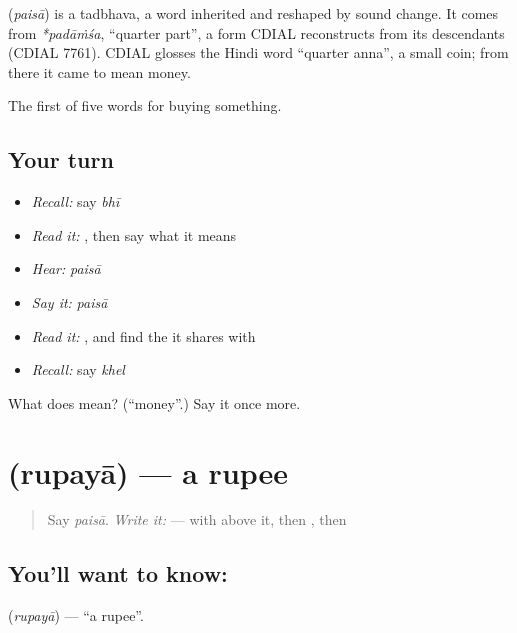 \begin{cousinweb}
\textbf{} (\emph{paisā}) is a tadbhava, a word inherited and reshaped by sound change. It comes from \emph{*padāṁśa}, \textquotedblleft{}quarter part\textquotedblright{}, a form CDIAL reconstructs from its descendants (CDIAL 7761). CDIAL glosses the Hindi word \textquotedblleft{}quarter anna\textquotedblright{}, a small coin; from there it came to mean money.
\end{cousinweb}

\begin{grammarlens}[title={What you've built}]
The first of five words for buying something.
\end{grammarlens}

\subsection*{Your turn}
\begin{itemize}
\raggedright
  \item \emph{Recall:} say \emph{bhī}
  \item \emph{Read it:} \textbf{}, then say what it means
  \item \emph{Hear:} \emph{paisā}
  \item \emph{Say it:} \emph{paisā}
  \item \emph{Read it:} , and find the  it shares with 
  \item \emph{Recall:} say \emph{khel}
\end{itemize}

\begin{tcolorbox}[breakable,colback=teal!4,colframe=teal!35!black,title={Before you move on}]
What does  mean? (\textquotedblleft{}money\textquotedblright{}.) Say it once more.
\end{tcolorbox}
\section[\texorpdfstring{\hi{रुपया} (rupayā)}{रुपया (rupayā)}]{ (rupayā) — a rupee}

\label{lesson:HI-C72-rupee}



\begin{quote}
Say \emph{paisā}. \emph{Write it:} \textbf{} —  with  above it, then , then 
\end{quote}

\subsection*{You'll want to know: }
\textbf{} (\emph{rupayā}) — \textquotedblleft{}a rupee\textquotedblright{}.

